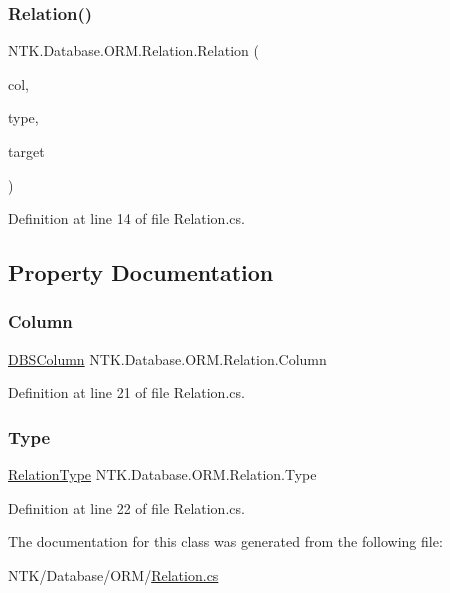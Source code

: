 \subsubsection{\texorpdfstring{Relation()}{Relation()}}
{\footnotesize\ttfamily N\+T\+K.\+Database.\+O\+R\+M.\+Relation.\+Relation (\begin{DoxyParamCaption}\item[{\mbox{\hyperlink{class_n_t_k_1_1_database_1_1_d_b_s_column}{D\+B\+S\+Column}}}]{col,  }\item[{\mbox{\hyperlink{namespace_n_t_k_1_1_database_1_1_o_r_m_a97fa169056f48b09978f26a00ef4151b}{Relation\+Type}}}]{type,  }\item[{\mbox{\hyperlink{class_n_t_k_1_1_database_1_1_o_r_m_1_1_base_model}{Base\+Model}}}]{target }\end{DoxyParamCaption})}



Definition at line 14 of file Relation.\+cs.



\subsection{Property Documentation}
\mbox{\label{class_n_t_k_1_1_database_1_1_o_r_m_1_1_relation_a822e2e262a0d1bb83a36a22a226deacc}} 
\subsubsection{\texorpdfstring{Column}{Column}}
{\footnotesize\ttfamily \mbox{\hyperlink{class_n_t_k_1_1_database_1_1_d_b_s_column}{D\+B\+S\+Column}} N\+T\+K.\+Database.\+O\+R\+M.\+Relation.\+Column\hspace{0.3cm}{\ttfamily [get]}}



Definition at line 21 of file Relation.\+cs.

\mbox{\label{class_n_t_k_1_1_database_1_1_o_r_m_1_1_relation_a6ce8784f33051e366390d72aa43c809a}} 
\subsubsection{\texorpdfstring{Type}{Type}}
{\footnotesize\ttfamily \mbox{\hyperlink{namespace_n_t_k_1_1_database_1_1_o_r_m_a97fa169056f48b09978f26a00ef4151b}{Relation\+Type}} N\+T\+K.\+Database.\+O\+R\+M.\+Relation.\+Type\hspace{0.3cm}{\ttfamily [get]}}



Definition at line 22 of file Relation.\+cs.



The documentation for this class was generated from the following file\+:\begin{DoxyCompactItemize}
\item 
N\+T\+K/\+Database/\+O\+R\+M/\mbox{\hyperlink{_relation_8cs}{Relation.\+cs}}\end{DoxyCompactItemize}
